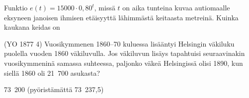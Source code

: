 \begin{tehtavasivu}
\begin{tehtava}
Funktio $ e(t)=15000\cdot 0,80^{t}$, missä $ t $ on aika tunteina kuvaa autiomaalle eksyneen janoisen ihmisen etäisyyttä lähimmästä keitaasta metreinä. Kuinka kaukana keidas on 
\begin{alakohdat}
\end{alakohdat}
\begin{vastaus}
\begin{alakohdat}
\end{alakohdat}
\end{vastaus}
\end{tehtava}

\begin{tehtava}
(YO 1877 4) Vuosikymmenen 1860--70 kuluessa lisääntyi Helsingin väkiluku puolella vuoden 1860 väkiluvulla. Jos väkiluvun lisäys tapahtuisi seuraavinakin vuosikymmeninä samassa suhteessa, paljonko väkeä Helsingissä olisi 1890, kun siellä 1860 oli 21~700 asukasta? 
	\begin{vastaus}
	73~200 (pyöristämättä 73~237,5)
	\end{vastaus}
\end{tehtava}



\end{tehtavasivu}
